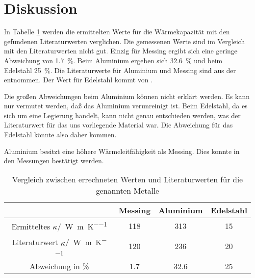 
\section{Diskussion}

In Tabelle \ref{tab:endergebnis} werden die ermittelten Werte für die Wärmekapazität mit den gefundenen Literaturwerten verglichen.
Die gemessenen Werte sind im Vergleich mit den Literaturwerten nicht
gut. Einzig für Messing ergibt sich eine geringe Abweichung von
\SI{1.7}{\percent}. Beim Aluminium ergeben sich \SI{32.6}{\percent} und
beim Edelstahl \SI{25}{\percent}. Die Literaturwerte für Aluminium und
Messing sind aus der \textcite{wikipedia:waermeleitfaehigkeit}
entnommen. Der Wert für Edelstahl kommt von
\textcite{schweizer-fn:waermeleitfaehigkeiten}.

Die großen Abweichungen beim Aluminium können nicht erklärt werden. Es
kann nur vermutet werden, daß das Aluminium verunreinigt ist. Beim
Edelstahl, da es sich um eine Legierung handelt, kann nicht genau
entschieden werden, was der Literaturwert für das uns vorliegende
Material war. Die Abweichung für das Edelstahl könnte also daher kommen.

Aluminium besitzt eine höhere Wärmeleitfähigkeit als Messing. Dies
konnte in den Messungen bestätigt werden.
\begin{table}
  \centering
  \begin{tabular}{c|c|c|c}
   &Messing& Aluminium& Edelstahl\\
    \midrule
Ermitteltes $\kappa$/\SI{}{\watt\per\metre\per\kelvin}	 &118 & 313 & 15\\
Literaturwert $\kappa$/\SI{}{\watt\per\metre\per\kelvin} &120 & 236 & 20\\
Abweichung in \si{\percent} & 1.7 & 32.6 & 25\\
    \bottomrule
  \end{tabular}
  \caption{Vergleich zwischen errechneten Werten und Literaturwerten für die genannten Metalle}
  \label{tab:endergebnis}
\end{table}